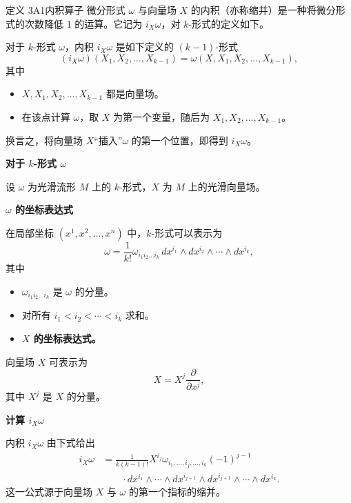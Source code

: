 \begin{statement}{定义 3A1}{内积算子}
微分形式 $\omega$ 与向量场 $X$ 的内积（亦称缩并）是一种将微分形式的次数降低 1 的运算。它记为 $i_X\omega$，对 $k$-形式的定义如下。

对于 $k$-形式 $\omega$，内积 $i_X\omega$ 是如下定义的 $(k-1)$-形式
\[
  (i_X\omega)(X_1,X_2,\dots,X_{k-1})=\omega(X,X_1,X_2,\dots,X_{k-1}),
\]
其中
\begin{itemize}
\item $X,X_1,X_2,\dots,X_{k-1}$ 都是向量场。
\item 在该点计算 $\omega$，取 $X$ 为第一个变量，随后为 $X_1,X_2,\dots,X_{k-1}$。
\end{itemize}
换言之，将向量场 $X$“插入”$\omega$ 的第一个位置，即得到 $i_X\omega$。
\end{statement}

\noindent\textbf{对于 $k$-形式 $\omega$}\par
设 $\omega$ 为光滑流形 $M$ 上的 $k$-形式，$X$ 为 $M$ 上的光滑向量场。

\noindent\textbf{$\omega$ 的坐标表达式}\par
在局部坐标 $(x^1,x^2,\dots,x^n)$ 中，$k$-形式可以表示为
\[
  \omega=\frac{1}{k!}\omega_{i_1i_2\dots i_k}
    \,dx^{i_1}\wedge dx^{i_2}\wedge\cdots\wedge dx^{i_k},
\]
其中
\begin{itemize}
\item $\omega_{i_1i_2\dots i_k}$ 是 $\omega$ 的分量。
\item 对所有 $i_1<i_2<\cdots<i_k$ 求和。%
\item \textbf{$X$ 的坐标表达式。}
\end{itemize}
向量场 $X$ 可表示为
\[
  X=X^j\frac{\partial}{\partial x^j},
\]
其中 $X^j$ 是 $X$ 的分量。

\noindent\textbf{计算 $i_X\omega$}\par
内积 $i_X\omega$ 由下式给出
\begin{align*}
 i_X\omega
   &=\frac{1}{k(k-1)!}X^{i_j}\omega_{i_1,\dots,i_j,\dots,i_k}(-1)^{j-1}\\
   &\qquad{}\cdot dx^{i_1}\wedge\cdots\wedge dx^{i_{j-1}}
         \wedge dx^{i_{j+1}}\wedge\cdots\wedge dx^{i_k}.
\end{align*}
这一公式源于向量场 $X$ 与 $\omega$ 的第一个指标的缩并。

